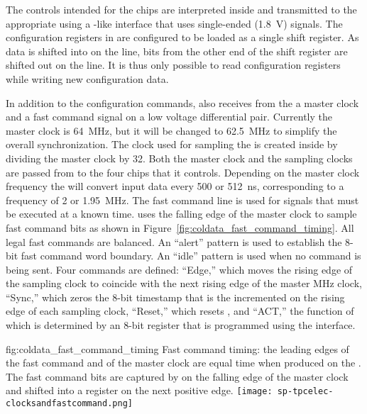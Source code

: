 The controls intended for the   chips are interpreted 
inside  and transmitted to the appropriate  using 
a -like interface that uses single-ended (\SI{1.8}{V})  
signals. The configuration registers in  are configured to be 
loaded as a single shift register. As data is shifted into  on 
the  line, bits from the other end of the shift register are shifted 
out on the  line. It is thus only possible to read  
configuration registers while writing new configuration data.

In addition to the configuration commands,  also receives from
the  a master clock and a fast command signal on a low voltage 
differential pair. Currently the master clock is \SI{64}{MHz}, but it will be
changed to \SI{62.5}{MHz} to simplify the overall   
synchronization. The clock used for sampling the  is created inside
 by dividing the master clock by \num{32}. Both the master clock and
the  sampling clocks are passed from  to the four
 chips that it controls. Depending on the master clock frequency
the  will convert input data every \num{500} or \SI{512}{ns}, 
corresponding to a frequency of \num{2} or \SI{1.95}{MHz}. The fast command 
line is used for signals that must be executed at a known time.  
uses the falling edge of the master clock to sample fast command bits as shown 
in Figure~\ref{fig:coldata_fast_command_timing}. All legal fast commands 
are  balanced. An ``alert'' pattern is used to establish the 8-bit 
fast command word boundary. An ``idle'' pattern is used when no command is being 
sent. Four commands are defined: ``Edge,'' which moves the rising edge of the 
 sampling clock to coincide with the next rising edge of the 
master MHz clock, ``Sync,'' which zeros the 8-bit timestamp that is the incremented 
on the rising edge of each  sampling clock, ``Reset,'' which resets 
, and ``ACT,'' the function of which is determined by an 8-bit 
register that is programmed using the  interface.  

\begin{dunefigure}
{fig:coldata_fast_command_timing}
{Fast command timing: the leading edges of the fast command and of the master 
clock are equal time when produced on the . The fast command bits 
are captured by  on the falling edge of the master clock and 
shifted into a register on the next positive edge.}
\texttt{[image: sp-tpcelec-clocksandfastcommand.png]}
\end{dunefigure}

